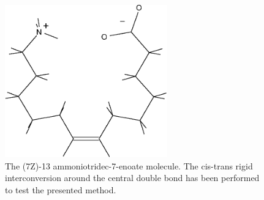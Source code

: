 \begin{figure}[ht]
\begin{center}
\includegraphics[width=7cm,keepaspectratio]{02_localization/images/7Z-molecule.eps}
\caption{\footnotesize The (7Z)-13 ammoniotridec-7-enoate molecule. The cis-trans rigid
interconversion around the central double bond has been performed to test
the presented method. }
\label{fig:7Z-molecule}
\end{center}
\end{figure}

